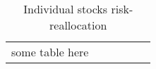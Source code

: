 \documentclass{beamer} %
\begin{document}
\begin{frame}
    \begin{table}
        \caption{Individual stocks risk-reallocation}
    \begin{tabular}{lccccc}
    some table here
    \end{tabular}
    \end{table}
\end{frame}
\end{document}
